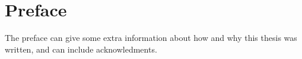 \chapter*{Preface}

The preface can give some extra information about how and why this thesis was written, and can include acknowledments.